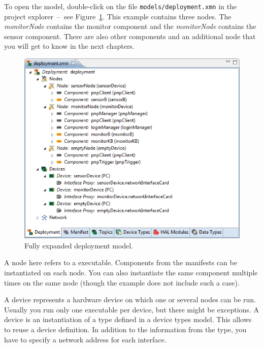 To open the model, double-click on the file \verb|models/deployment.xmn| in the project explorer~--~see Figure~\ref{fig:xmt_deployment.png}.
This example contains three nodes.
The \emph{monitorNode} contains the monitor component and the \emph{monitorNode} contains the sensor component.
There are also other components and an additional node that you will get to know in the next chapters.

\begin{figure}[htpb]
	\centering
	\includegraphics[scale=0.75]{figures/xmt_deployment.png}
	\caption{Fully expanded deployment model.}
	\label{fig:xmt_deployment.png}
\end{figure}

A node here refers to a \xme executable.
Components from the manifests can be instantiated on each node.
You can also instantiate the same component multiple times on the same node (though the example does not include such a case).

A device represents a hardware device on which one or several nodes can be run.
Usually you run only one \xme executable per device, but there might be exceptions.
A device is an instantiation of a type defined in a device types model.
This allows to reuse a device definition.
In addition to the information from the type, you have to specify a network address for each interface.

